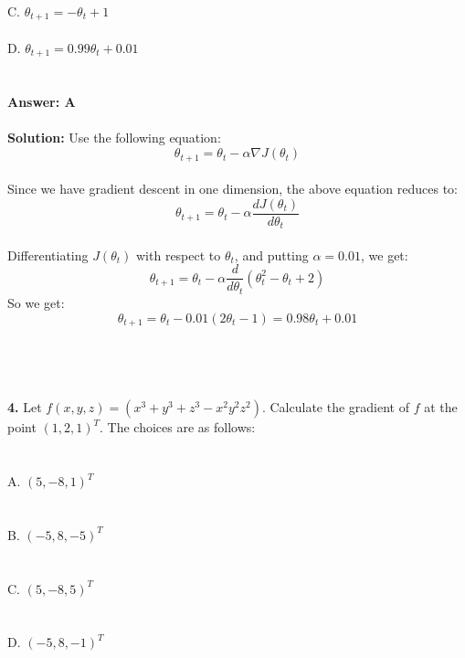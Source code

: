 \documentclass[prl,twocolumn,showpacs,preprintnumbers,superscriptaddress]{revtex4}
\theoremstyle{plain}
\theoremstyle{definition}
\begin{document}
\begin{widetext}
\\
C. $\theta_{t + 1} = -\theta_{t} + 1$\\
\\
D. $\theta_{t + 1} = 0.99\theta_{t} + 0.01$
\\
\\
\\
\textbf{Answer: A}
\\
\\
\textbf{Solution:}
Use the following equation:
\begin{equation}
    \theta_{t + 1} = \theta_{t} - \alpha \nabla J(\theta_{t}) {}\nonumber
\end{equation}
\\
Since we have gradient descent in one dimension, the above equation reduces to:
\begin{equation}
    \theta_{t + 1} = \theta_{t} - \alpha \frac{d J(\theta_{t})}{d\theta_{t}} {}\nonumber
\end{equation}
\\
Differentiating $J(\theta_{t})$ with respect to $\theta_{t}$, and putting $\alpha = 0.01$, we get:
\\
\begin{equation}
    \theta_{t + 1} = \theta_{t} - \alpha \frac{d}{d\theta_{t}}(\theta_{t}^2 - \theta_{t} + 2) {}\nonumber
\end{equation}
So we get:
\begin{equation}
    \theta_{t + 1} = \theta_{t} - 0.01 (2\theta_{t} - 1) = 0.98\theta_{t} + 0.01 {}\nonumber
\end{equation}
\\
\\
\\
\\
\textbf{4.} Let $f(x,y,z) = (x^3 + y^3 + z^3 - x^2y^2z^2)$.
Calculate the gradient of $f$ at the point $(1, 2, 1)^T$. The choices are as follows:
\\
\\
\\
A. $(5, - 8, 1)^T$
\\
\\
\\
B. $(- 5, 8, - 5)^T$
\\
\\
\\
C. $(5, - 8, 5)^T$
\\
\\
\\
D. $(- 5, 8, - 1)^T$
\\

\end{widetext}
\end{document}
